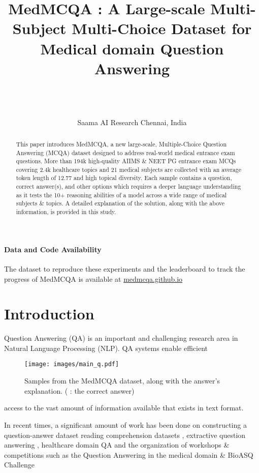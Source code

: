 \documentclass[pmlr,twocolumn,10pt]{jmlr}
\title[MedMCQA : Multi-Subject Multi-Choice Dataset]{MedMCQA : A Large-scale Multi-Subject Multi-Choice Dataset for Medical domain Question Answering}
\author{\Name{Ankit Pal} \Email{ankit.pal@saama.com}\\
 \Name{Logesh Kumar Umapathi} \Email{logesh.umapathi@saama.com}\\
 \Name{Malaikannan Sankarasubbu} \Email{malaikannan.sankarasubbu@saama.com}\\
 \addr Saama AI Research Chennai, India
}
\begin{document}
\maketitle

\begin{abstract}
This paper introduces MedMCQA, a new large-scale, Multiple-Choice Question Answering (MCQA) dataset designed to address real-world medical entrance exam questions. More than 194k high-quality AIIMS \& NEET PG entrance exam MCQs covering 2.4k healthcare topics and 21 medical subjects are collected with an average token length of 12.77 and high topical diversity. Each sample contains a question, correct answer(s), and other options which requires a deeper language understanding as it tests the 10+ reasoning abilities of a model across a wide range of medical subjects \& topics. A detailed explanation of the solution, along with the above information, is provided in this study.
\end{abstract}

\paragraph*{Data and Code Availability}
The dataset to reproduce these experiments and the leaderboard to track the progress of MedMCQA is available at \url{medmcqa.github.io}

\section{Introduction}
Question Answering (QA) is an important and challenging research area in Natural Language Processing (NLP). QA systems enable efficient
\begin{figure}
    \centering
  \texttt{[image: images/main\_q.pdf]} \caption{\footnotesize Samples from the MedMCQA dataset, along with the answer’s explanation.  ({\cmark} : the correct answer)}
  \label{fig:questions}
\end{figure}
access to the vast amount of information available that exists in text format.

In recent times, a significant amount of work has been done on constructing a question-answer dataset \citep{Rajpurkar2016,rajpurkar2018know,Reddy2019CoQAAC,Kwiatkowski2019,Yang2015} reading comprehension datasets \citep{Yang2018,Lai2017,Zellers2018,Yagcioglu2018,Dua2019,Bajaj2018,Huang2019}, extractive question answering \citep{Hermann2015,Trischler2017}, healthcare domain QA \citep{Jin2019,Clicr,CovidQA} and the organization of workshops \& competitions such as the Question Answering in the medical domain \& BioASQ Challenge \citep{MEDIQA, Nentidis_2020}
\end{document}
